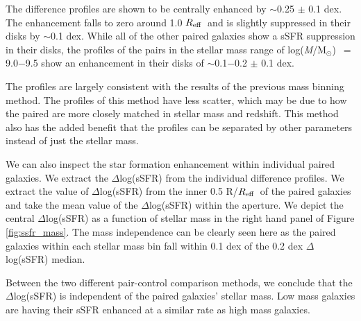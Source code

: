 \documentclass[iop,revtex4,twocolumn,apj,numberedappendix,appendixfloats]{emulateapj}
\newcommand{\reff}{$R_{\rm eff}$}
\newcommand{\logm}{log({\it M}/M$_{\odot}$)}
\begin{document}
The difference profiles are shown to be centrally enhanced by $\sim$0.25 $\pm$ 0.1 dex. The enhancement falls to zero around 1.0 \reff\ and is slightly suppressed in their disks by $\sim$0.1 dex. While all of the other paired galaxies show a sSFR suppression in their disks, the profiles of the pairs in the stellar mass range of \logm\ $=$ 9.0$-$9.5 show an enhancement in their disks of $\sim$0.1$-$0.2 $\pm$ 0.1 dex. 

The profiles are largely consistent with the results of the previous mass binning method. The profiles of this method have less scatter, which may be due to how the paired are more closely matched in stellar mass and redshift. This method also has the added benefit that the profiles can be separated by other parameters instead of just the stellar mass. 

We can also inspect the star formation enhancement within individual paired galaxies. We extract the $\Delta$log(sSFR) from the individual difference profiles. We extract the value of $\Delta$log(sSFR) from the inner 0.5 R/\reff\ of the paired galaxies and take the mean value of the $\Delta$log(sSFR) within the aperture. We depict the central $\Delta$log(sSFR) as a function of stellar mass in the right hand panel of Figure \ref{fig:ssfr_mass}. The mass independence can be clearly seen here as the paired galaxies within each stellar mass bin fall within 0.1 dex of the 0.2 dex $\Delta$log(sSFR) median. 

Between the two different pair-control comparison methods, we conclude that the $\Delta$log(sSFR) is independent of the paired galaxies' stellar mass. Low mass galaxies are having their sSFR enhanced at a similar rate as high mass galaxies. 
\end{document}
